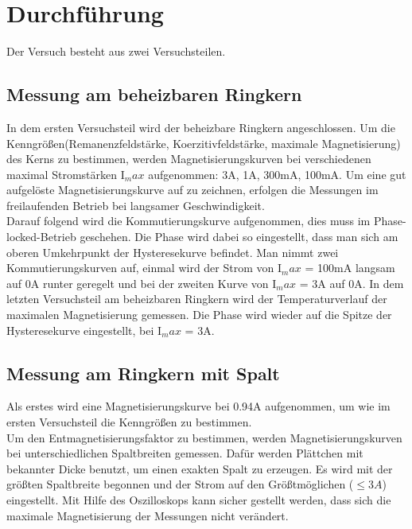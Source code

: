 \section{Durchführung}
    Der Versuch besteht aus zwei Versuchsteilen.
    \subsection{Messung am beheizbaren Ringkern}
        In dem ersten Versuchsteil wird der beheizbare Ringkern angeschlossen. 
        Um die Kenngrößen(Remanenzfeldstärke, Koerzitivfeldstärke, maximale Magnetisierung) des Kerns zu bestimmen,
        werden Magnetisierungskurven bei verschiedenen maximal Stromstärken I$_max$ aufgenommen:
        3A, 1A, 300mA, 100mA. Um eine gut aufgelöste Magnetisierungskurve auf zu zeichnen, 
        erfolgen die Messungen im freilaufenden Betrieb bei langsamer Geschwindigkeit.
        \\
        Darauf folgend wird die Kommutierungskurve aufgenommen, dies muss im Phase-locked-Betrieb
        geschehen. Die Phase wird dabei so eingestellt, dass man sich am oberen Umkehrpunkt der Hysteresekurve
        befindet. Man nimmt zwei Kommutierungskurven auf, einmal wird der Strom von I$_max$ = 100mA langsam auf 0A runter geregelt und
        bei der zweiten Kurve von I$_max$ = 3A auf 0A.
        In dem letzten Versuchsteil am beheizbaren Ringkern wird der Temperaturverlauf der
        maximalen Magnetisierung gemessen. Die Phase wird wieder auf die Spitze der Hysteresekurve
        eingestellt, bei I$_max$ = 3A.

    \subsection{Messung am Ringkern mit Spalt}
        Als erstes wird eine Magnetisierungskurve bei 0.94A aufgenommen, um wie im ersten Versuchsteil
        die Kenngrößen zu bestimmen. \\
        Um den Entmagnetisierungsfaktor zu bestimmen, werden Magnetisierungskurven bei unterschiedlichen
        Spaltbreiten gemessen. Dafür werden Plättchen mit bekannter Dicke benutzt, um einen exakten Spalt zu erzeugen.
        Es wird mit der größten Spaltbreite begonnen und der Strom auf den Größtmöglichen ($\leq 3A$) eingestellt.
        Mit Hilfe des Oszilloskops kann sicher gestellt werden, dass sich die maximale Magnetisierung der Messungen
        nicht verändert.